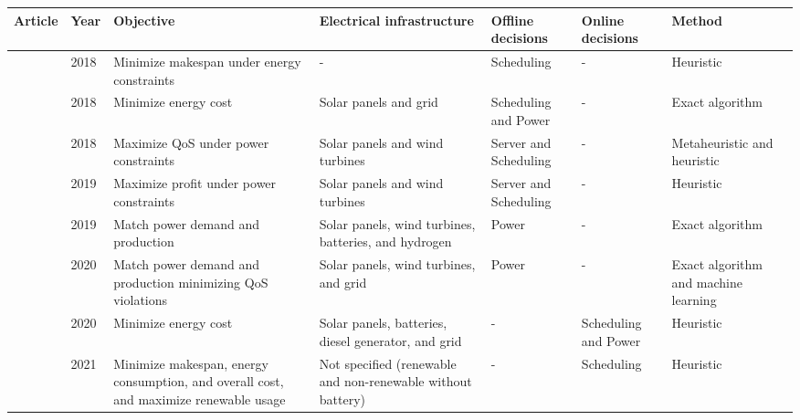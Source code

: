 \begin{landscape}
\begin{table*}[htp]
\centering
\begin{tabular}{m{3cm}|m{0.8cm}|m{3cm}|m{3.2cm}|m{3cm}|m{3cm}|m{3cm}}
\hline
Article & Year & Objective & Electrical infrastructure & Offline decisions & Online decisions & Method \\ \hline\hline
\citeauthor{hu2018schedule} \cite{hu2018schedule} & 2018 & Minimize makespan under energy constraints & - & Scheduling & - & Heuristic \\ \hline
\citeauthor{lu2018energy} \cite{lu2018energy} & 2018 & Minimize energy cost & Solar panels and grid & Scheduling and Power & - & Exact algorithm \\ \hline
\citeauthor{caux2018optimization} \cite{caux2018optimization} & 2018 & Maximize QoS under power constraints & Solar panels and wind turbines & Server and Scheduling & - & Metaheuristic and heuristic\\ \hline
\citeauthor{caux2019phase} \cite{caux2019phase} & 2019 & Maximize profit under power constraints & Solar panels and wind turbines & Server and Scheduling & - & Heuristic\\ \hline
\citeauthor{haddad2019mixed} \cite{haddad2019mixed} & 2019 & Match power demand and production & Solar panels, wind turbines, batteries, and hydrogen & Power & - & Exact algorithm \\ \hline
\citeauthor{gao2020smartly} \cite{gao2020smartly} & 2020 & Match power demand and production minimizing QoS violations & Solar panels, wind turbines, and grid & Power & - & Exact algorithm and machine learning \\ \hline
\citeauthor{haghshenas2020infrastructure} \cite{haghshenas2020infrastructure} & 2020 & Minimize energy cost & Solar panels, batteries, diesel generator, and grid & - & Scheduling and Power & Heuristic \\ \hline
\citeauthor{nayak2021efficient} \cite{nayak2021efficient} & 2021 & Minimize makespan, energy consumption, and overall cost, and maximize renewable usage & Not specified (renewable and non-renewable without battery) & - & Scheduling & Heuristic \\ \hline
\end{tabular}
\end{table*}


\end{landscape}

